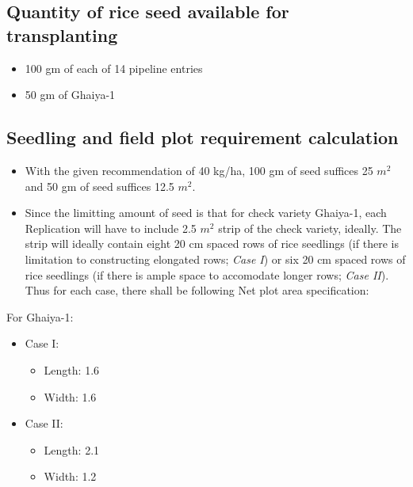 \documentclass[12pt,]{article}
\providecommand{\tightlist}{%
  \setlength{\itemsep}{0pt}\setlength{\parskip}{0pt}}
\begin{document}
\hypertarget{quantity-of-rice-seed-available-for-transplanting}{%
\subsection{Quantity of rice seed available for transplanting}\label{quantity-of-rice-seed-available-for-transplanting}}

\begin{itemize}
\tightlist
\item
  100 gm of each of 14 pipeline entries
\item
  50 gm of Ghaiya-1
\end{itemize}

\hypertarget{seedling-and-field-plot-requirement-calculation}{%
\subsection{Seedling and field plot requirement calculation}\label{seedling-and-field-plot-requirement-calculation}}

\begin{itemize}
\tightlist
\item
  With the given recommendation of 40 kg/ha, 100 gm of seed suffices 25 \(m^2\) and 50 gm of seed suffices 12.5 \(m^2\).
\item
  Since the limitting amount of seed is that for check variety Ghaiya-1, each Replication will have to include 2.5 \(m^2\) strip of the check variety, ideally. The strip will ideally contain eight 20 cm spaced rows of rice seedlings (if there is limitation to constructing elongated rows; \emph{Case I}) or six 20 cm spaced rows of rice seedlings (if there is ample space to accomodate longer rows; \emph{Case II}). Thus for each case, there shall be following Net plot area specification:
\end{itemize}

For Ghaiya-1:

\begin{itemize}
\tightlist
\item
  Case I:

  \begin{itemize}
  \tightlist
  \item
    Length: 1.6
  \item
    Width: 1.6
  \end{itemize}
\item
  Case II:

  \begin{itemize}
  \tightlist
  \item
    Length: 2.1
  \item
    Width: 1.2
  \end{itemize}
\end{itemize}
\end{document}

